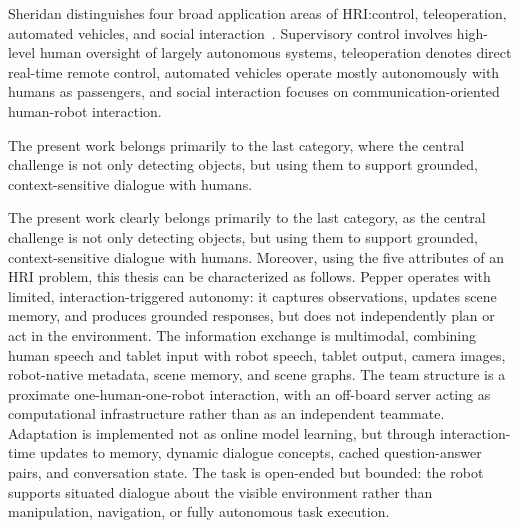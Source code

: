 Sheridan distinguishes four broad application areas of HRI:\@supervisory control, teleoperation, automated vehicles, and social interaction~\cite[525--526]{Sheridan2016HRI}. Supervisory control involves high-level human oversight of largely autonomous systems, teleoperation denotes direct real-time remote control, automated vehicles operate mostly autonomously with humans as passengers, and social interaction focuses on communication-oriented human-robot interaction.

The present work belongs primarily to the last category, where the central challenge is not only detecting objects, but using them to support grounded, context-sensitive dialogue with humans.

The present work clearly belongs primarily to the last category, as the central challenge is not only detecting objects, but using them to support grounded, context-sensitive dialogue with humans. Moreover, using the five attributes of an HRI problem, this thesis can be characterized as follows. Pepper operates with limited, interaction-triggered autonomy: it captures observations, updates scene memory, and produces grounded responses, but does not independently plan or act in the environment. The information exchange is multimodal, combining human speech and tablet input with robot speech, tablet output, camera images, robot-native metadata, scene memory, and scene graphs. The team structure is a proximate one-human-one-robot interaction, with an off-board server acting as computational infrastructure rather than as an independent teammate. Adaptation is implemented not as online model learning, but through interaction-time updates to memory, dynamic dialogue concepts, cached question-answer pairs, and conversation state. The task is open-ended but bounded: the robot supports situated dialogue about the visible environment rather than manipulation, navigation, or fully autonomous task execution.


